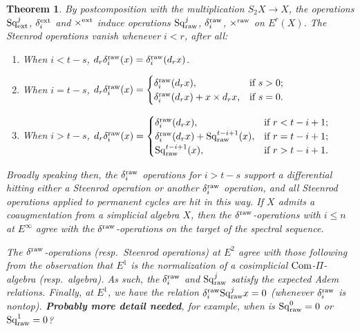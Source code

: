 \documentclass[11pt]{amsart}
\theoremstyle{plain}
\newtheorem{thm}{Theorem}[section]
\theoremstyle{definition}
\renewcommand{\to}{\longrightarrow}
\newcommand{\squishlist}{
  \setlength{\itemsep}{.5pt}
  \setlength{\parskip}{0pt}
  \setlength{\parsep}{0pt}}
\theoremstyle{plain}
\newcommand{\Sq}{\mathrm{Sq}}
\begin{document}
\begin{External spectral sequence operations}
\begin{thm}
By postcomposition with the multiplication $S_2X\to X$, the operations $\Sq^j_\textup{ext}$, $\delta_i^\textup{ext}$ and $\times^\textup{ext}$ induce operations $\Sq^j_\textup{raw}$, $\delta_i^\textup{raw}$, $\times^\textup{raw}$ on $E^r(X)$. The Steenrod operations vanish whenever $i<r$, after all:
\begin{enumerate}\squishlist
\setlength{\parindent}{.25in}
\item When $i<t-s$, $d_r\delta^\textup{raw}_i(x)=\delta^\textup{raw}_i(d_rx)$.
\item When $i=t-s$, $d_r\delta^\textup{raw}_i(x)=\begin{cases}
\delta^\textup{raw}_i(d_rx),&\textup{if }s>0;\\
\delta^\textup{raw}_i(d_rx)+x\times d_rx,&\textup{if }s=0.
\end{cases}$
\item When $i>t-s$, $d_r\delta^\textup{raw}_i(x)=\begin{cases}
\delta^\textup{raw}_i(d_rx),&\textup{if }r<t-i+1;\\
\delta^\textup{raw}_i(d_rx)+\Sq_\textup{raw}^{t-i+1}(x),&\textup{if }r=t-i+1;\\
\Sq_\textup{raw}^{t-i+1}(x),&\textup{if }r>t-i+1.\\
\end{cases}$
\end{enumerate}
Broadly speaking then, the $\delta^\textup{raw}_i$ operations for $i>t-s$ support a differential hitting either a Steenrod operation or another $\delta^\textup{raw}_i$ operation, and all Steenrod operations applied to permanent cycles are hit in this way. If $X$ admits a coaugmentation from a simplicial algebra $X$, then the $\delta^\textup{raw}$-operations with $i\leq n$ at $E^\infty$ agree with the $\delta^\textup{raw}$-operations on the target of the spectral sequence.

The $\delta^\textup{raw}$-operations (resp.\ Steenrod operations)  at $E^2$ agree with those following from the observation that $E^1$ is the normalization of a cosimplicial $\textup{Com}$-$\Pi$-algebra (resp.\ algebra). As such, the $\delta_i^\textup{raw}$ and $\Sq^j_\textup{raw}$ satisfy the expected Adem relations. Finally, at $E^1$, we have the relation $\delta_i^\textup{raw}\Sq^j_\textup{raw}x=0$ (whenever $\delta_i^\textup{raw}$ is nontop). \textbf{Probably more detail needed}, for example, when is $\Sq_\textup{raw}^0=0$ or $\Sq_\textup{raw}^1=0$?


\end{thm}
\end{External spectral sequence operations}
\end{document}

